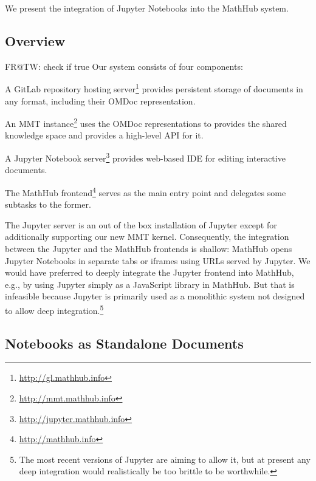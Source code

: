We present the integration of Jupyter Notebooks into the MathHub system.



\subsection{Overview}

\begin{newpart}{FR@TW: check if true}
Our system consists of four components:
\begin{compactitem}
\item A GitLab repository hosting server\footnote{\url{http://gl.mathhub.info}} provides persistent storage of documents in any format, including their OMDoc representation.
\item An MMT instance\footnote{\url{http://mmt.mathhub.info}} uses the OMDoc representations to provides the shared knowledge space and provides a high-level API for it.
\item A Jupyter Notebook server\footnote{\url{http://jupyter.mathhub.info}} provides web-based IDE for editing interactive documents.
\item The MathHub frontend\footnote{\url{http://mathhub.info}} serves as the main entry point and delegates some subtasks to the former.
\end{compactitem}

The Jupyter server is an out of the box installation of Jupyter except for additionally supporting our new MMT kernel.
Consequently, the integration between the Jupyter and the MathHub frontends is shallow: MathHub opens Jupyter Notebooks in separate tabs or iframes using URLs served by Jupyter.
We would have preferred to deeply integrate the Jupyter frontend into MathHub, e.g., by using Jupyter simply as a JavaScript library in MathHub.
But that is infeasible because Jupyter is primarily used as a monolithic system not designed to allow deep integration.\footnote{The most recent versions of Jupyter are aiming to allow it, but at present any deep integration would realistically be too brittle to be worthwhile.}
\end{newpart}

\subsection{Notebooks as Standalone Documents}

